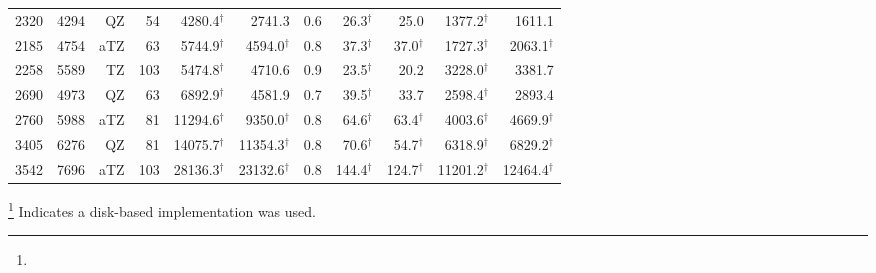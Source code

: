 \begin{table}[H]
\begin{tabular}{lrrrrrrrrrr}
2320& 4294&    QZ&    54&  4280.4$^{\dagger}$ &             2741.3&     0.6 &   26.3$^{\dagger}$ &               25.0&  1377.2$^{\dagger}$&              1611.1\\
2185& 4754&   aTZ&    63&  5744.9$^{\dagger}$ & 4594.0$^{\dagger}$&     0.8 &   37.3$^{\dagger}$ &   37.0$^{\dagger}$&  1727.3$^{\dagger}$&  2063.1$^{\dagger}$\\
2258& 5589&    TZ&   103&  5474.8$^{\dagger}$ &             4710.6&     0.9 &   23.5$^{\dagger}$ &               20.2&  3228.0$^{\dagger}$&              3381.7\\
2690& 4973&    QZ&    63&  6892.9$^{\dagger}$ &             4581.9&     0.7 &   39.5$^{\dagger}$ &               33.7&  2598.4$^{\dagger}$&              2893.4\\
2760& 5988&   aTZ&    81& 11294.6$^{\dagger}$ & 9350.0$^{\dagger}$&     0.8 &   64.6$^{\dagger}$ &   63.4$^{\dagger}$&  4003.6$^{\dagger}$&  4669.9$^{\dagger}$\\
3405& 6276&    QZ&    81& 14075.7$^{\dagger}$ &11354.3$^{\dagger}$&     0.8 &   70.6$^{\dagger}$ &   54.7$^{\dagger}$&  6318.9$^{\dagger}$&  6829.2$^{\dagger}$\\
3542& 7696&   aTZ&   103& 28136.3$^{\dagger}$ &23132.6$^{\dagger}$&     0.8 &  144.4$^{\dagger}$ &  124.7$^{\dagger}$& 11201.2$^{\dagger}$& 12464.4$^{\dagger}$\\

\hline
\end{tabular}
\renewcommand{\thefootnote}{\fnsymbol{footnote}}
\footnote[2]{} Indicates a disk-based implementation was used.
\end{table}
\endgroup


